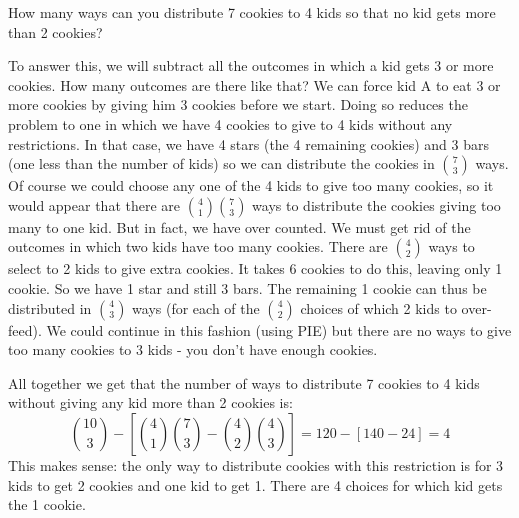 \documentclass[12pt]{article}
\begin{document}
\begin{example}
How many ways can you distribute 7 cookies to 4 kids so that no kid gets more than 2 cookies?  

\begin{solution}
To answer this, we will subtract all the outcomes in which a kid gets 3 or more cookies.  How many outcomes are there like that?  We can force kid A to eat 3 or more cookies by giving him 3 cookies before we start.  Doing so reduces the problem to one in which we have 4 cookies to give to 4 kids without any restrictions.  In that case, we have 4 stars (the 4 remaining cookies) and 3 bars (one less than the number of kids) so we can distribute the cookies in ${7 \choose 3}$ ways.  Of course we could choose any one of the 4 kids to give too many cookies, so it would appear that there are ${4 \choose 1}{7 \choose 3}$ ways to distribute the cookies giving too many to one kid.  But in fact, we have over counted.  We must get rid of the outcomes in which two kids have too many cookies.  There are ${4 \choose 2}$ ways to select to 2 kids to give extra cookies.  It takes 6 cookies to do this, leaving only 1 cookie.  So we have 1 star and still 3 bars.  The remaining 1 cookie can thus be distributed in ${4 \choose 3}$ ways (for each of the ${4 \choose 2}$ choices of which 2 kids to over-feed).  We could continue in this fashion (using PIE) but there are no ways to give too many cookies to 3 kids - you don't have enough cookies.

All together we get that the number of ways to distribute 7 cookies to 4 kids without giving any kid more than 2 cookies is:
\[{10 \choose 3} - \left[{4 \choose 1}{7 \choose 3} - {4 \choose 2}{4 \choose 3}\right] = 120 - [ 140 - 24] = 4\]
This makes sense: the only way to distribute cookies with this restriction is for 3 kids to get 2 cookies and one kid to get 1.  There are 4 choices for which kid gets the 1 cookie.
\end{solution}
\end{example}
\end{document}

